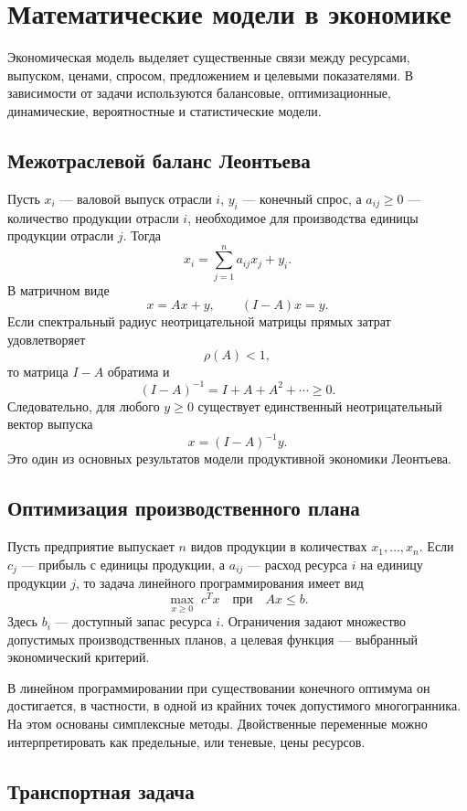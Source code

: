 \section{Математические модели в экономике}
\label{sec:models-in-economics}

Экономическая модель выделяет существенные связи между ресурсами,
выпуском, ценами, спросом, предложением и целевыми показателями. В
зависимости от задачи используются балансовые, оптимизационные,
динамические, вероятностные и статистические модели.

\subsection{Межотраслевой баланс Леонтьева}

Пусть $x_i$ --- валовой выпуск отрасли $i$, $y_i$ --- конечный спрос, а
$a_{ij}\ge0$ --- количество продукции отрасли $i$, необходимое для
производства единицы продукции отрасли $j$. Тогда
\[
x_i=\sum_{j=1}^n a_{ij}x_j+y_i.
\]
В матричном виде
\[
\boxed{x=Ax+y},
\qquad
\boxed{(I-A)x=y}.
\]
Если спектральный радиус неотрицательной матрицы прямых затрат удовлетворяет
\[
\boxed{\rho(A)<1},
\]
то матрица $I-A$ обратима и
\[
(I-A)^{-1}=I+A+A^2+\cdots\ge0.
\]
Следовательно, для любого $y\ge0$ существует единственный неотрицательный
вектор выпуска
\[
\boxed{x=(I-A)^{-1}y}.
\]
Это один из основных результатов модели продуктивной экономики Леонтьева.

\subsection{Оптимизация производственного плана}

Пусть предприятие выпускает $n$ видов продукции в количествах
$x_1,\ldots,x_n$. Если $c_j$ --- прибыль с единицы продукции, а
$a_{ij}$ --- расход ресурса $i$ на единицу продукции $j$, то задача
линейного программирования имеет вид
\[
\boxed{
\max_{x\ge0}\;c^Tx
\quad\text{при}\quad
Ax\le b.
}
\]
Здесь $b_i$ --- доступный запас ресурса $i$. Ограничения задают множество
допустимых производственных планов, а целевая функция --- выбранный
экономический критерий.

В линейном программировании при существовании конечного оптимума он
достигается, в частности, в одной из крайних точек допустимого многогранника.
На этом основаны симплексные методы. Двойственные переменные можно
интерпретировать как предельные, или теневые, цены ресурсов.

\subsection{Транспортная задача}

